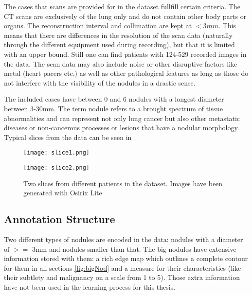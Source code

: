 \documentclass[../Thesis.tex]{subfiles}
\begin{document}
The cases that scans are provided for in the dataset fullfill certain criteria. The CT scans are exclusively of the lung only and do not contain other body parts or organs. The  reconstruction interval and collimation are kept at $<3mm$. This means that there are differences in the resolution of the scan data (naturally through the different equipment used during recording), but that it is limited with an upper bound. Still one can find patients with 124-529 recorded images in the data. The scan data may also include noise or other disruptive factors like metal (heart pacers etc.) as well as other pathological features as long as those do not interfere with the visibility of the nodules in a drastic sense.

The included cases have between 0 and 6 nodules with a longest diameter between 3-30mm. The term nodule refers to a brought spectrum of tissue abnormalities and can represent not only lung cancer but also other metastatic diseases or non-cancerous processes or lesions that have a nodular morphology. Typical slices from the data can be seen in 

\begin{figure}[!tbp]
\centering
\begin{minipage}[b]{0.45\textwidth}
	\texttt{[image: slice1.png]}
\end{minipage}
\begin{minipage}[b]{0.45\textwidth}
	\texttt{[image: slice2.png]}
\end{minipage}
\caption{Two slices from different patients in the dataset. Images have been generated with Osirix Lite \cite{rosset2004osirix}}
\label{fig:slices}
\end{figure}

\subsection{Annotation Structure}
Two different types of nodules are encoded in the data: nodules with a diameter of $>=$ 3mm and nodules smaller than that. The big nodules have extensive information stored with them: a rich edge map which outlines a complete contour for them in all sections \ref{fig:bigNod} and a measure for their characteristics (like their subtlety and malignancy on a scale from 1 to 5). Those extra information have not been used in the learning process for this thesis.
\end{document}
